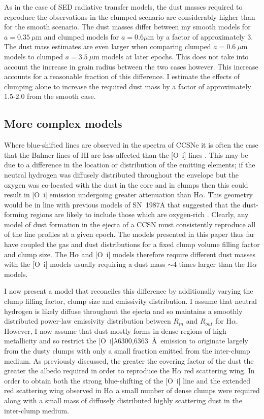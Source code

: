 As in the case of SED radiative transfer models, the dust masses required 
to reproduce the observations in the clumped scenario are considerably 
higher than for the smooth scenario.  The dust masses differ between my 
smooth models for $a=0.35~\mu$m and clumped models for $a=0.6\mu$m by a 
factor of approximately 3.  The dust mass estimates are even larger when
comparing clumped $a=0.6~\mu$m models to clumped $a=3.5~\mu$m models at 
later epochs. This does not take into account the increase in grain radius 
between the two cases however.  This increase accounts for a reasonable 
fraction of this difference. I estimate the effects of clumping alone to 
increase the required dust mass by a factor of approximately 1.5-2.0 from 
the smooth case.


\subsection{More complex models}
\label{complex}

Where blue-shifted lines are observed in the spectra of CCSNe it is often the case that the Balmer lines of HI are less affected than the [O~{\sc i}] lines \citep{Milisavljevic2012}.  This may be due to a difference in the location or distribution of the emitting elements; if the neutral hydrogen was diffusely distributed throughout the envelope but the oxygen was co-located with the dust in the core and in clumps then this could result in [O~{\sc i}] emission undergoing greater attenuation than H$\alpha$.  This geometry would be in line with previous models of SN~1987A that suggested that the dust-forming regions are likely to include those which are oxygen-rich \citep{Kozma1998a}.  Clearly, any model of dust formation in the ejecta of a CCSN must consistently reproduce all of the line profiles at a given epoch.  The models presented in this paper thus far have coupled the gas and dust distributions for a fixed clump volume filling factor and clump size.  The H$\alpha$ and [O~{\sc i}] models therefore require different dust masses with the [O~{\sc i}] models usually requiring a dust mass $\sim4$ times larger than the H$\alpha$ models. 

I now present a model that reconciles this difference by additionally varying the clump filling factor, clump size and emissivity distribution.  I assume that neutral hydrogen is likely diffuse throughout the ejecta and so maintains a smoothly distributed power-law emissivity distribution between $R_{in}$ and $R_{out}$ for H$\alpha$.  However, I now assume that dust mostly forms in dense regions of high metallicity and so restrict the [O~{\sc i}]$\lambda$6300,6363~\AA\ emission to originate largely from the dusty clumps with only a small fraction emitted from the inter-clump medium.  As previously discussed, the greater the covering factor of the dust the greater the albedo required in order to reproduce the H$\alpha$ red scattering wing. In order to obtain both the strong blue-shifting of the [O~{\sc i}] line and the extended red scattering wing observed in H$\alpha$ a small number of dense clumps were required along with a small mass of diffusely distributed highly scattering dust in the inter-clump medium.


